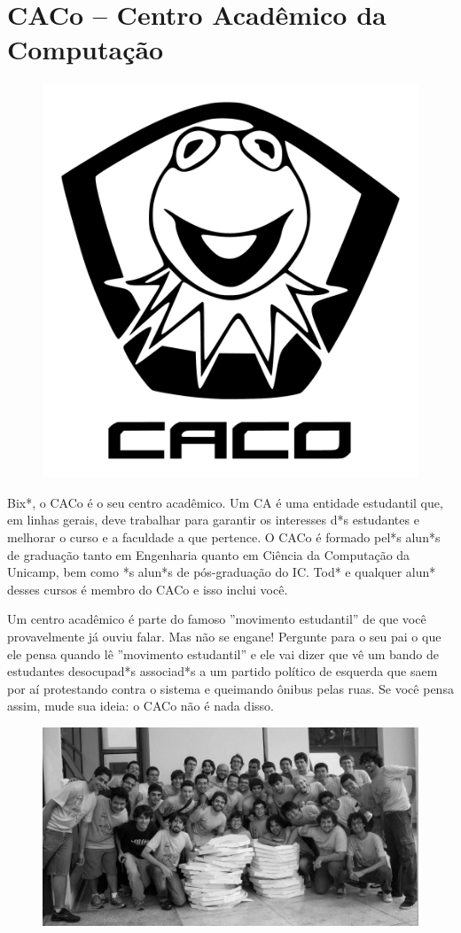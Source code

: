 
\section{CACo -- Centro Acadêmico da Computação}

\begin{figure}[H]
    \centering
    \includegraphics[width=.35\textwidth]{img/caco_logo.pdf}
\end{figure}

Bix*, o CACo é o seu centro acadêmico. Um CA é uma entidade estudantil que, em
linhas gerais, deve trabalhar para garantir os interesses d*s estudantes e
melhorar o curso e a faculdade a que pertence. O CACo é formado pel*s alun*s de
graduação tanto em Engenharia quanto em Ciência da Computação da Unicamp, bem
como *s alun*s de pós-graduação do IC. Tod* e qualquer alun* desses cursos é
membro do CACo e isso inclui você.

Um centro acadêmico é parte do famoso ''movimento estudantil'' de que você
provavelmente já ouviu falar. Mas não se engane! Pergunte para o seu pai o que
ele pensa quando lê ''movimento estudantil'' e ele vai dizer que vê um bando de
estudantes desocupad*s associad*s a um partido político de esquerda que saem por
aí protestando contra o sistema e queimando ônibus pelas ruas. Se você pensa
assim, mude sua ideia: o CACo não é nada disso.

\begin{figure}[H]
    \centering
    \includegraphics[width=.45\textwidth]{img/alem_da_graduacao/caco_pizzada1.jpg}
\end{figure}

